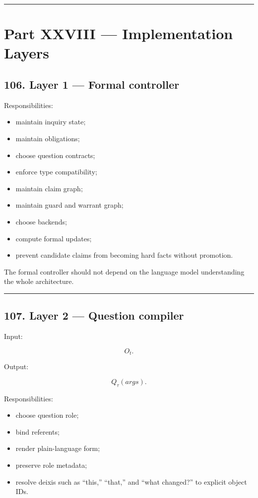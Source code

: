 \documentclass[
]{article}
\providecommand{\tightlist}{%
  \setlength{\itemsep}{0pt}\setlength{\parskip}{0pt}}
\begin{document}
\begin{center}\rule{0.5\linewidth}{0.5pt}\end{center}

\section{Part XXVIII --- Implementation
Layers}\label{part-xxviii-implementation-layers}

\subsection{106. Layer 1 --- Formal
controller}\label{layer-1-formal-controller}

Responsibilities:

\begin{itemize}
\tightlist
\item
  maintain inquiry state;
\item
  maintain obligations;
\item
  choose question contracts;
\item
  enforce type compatibility;
\item
  maintain claim graph;
\item
  maintain guard and warrant graph;
\item
  choose backends;
\item
  compute formal updates;
\item
  prevent candidate claims from becoming hard facts without promotion.
\end{itemize}

The formal controller should not depend on the language model
understanding the whole architecture.

\begin{center}\rule{0.5\linewidth}{0.5pt}\end{center}

\subsection{107. Layer 2 --- Question
compiler}\label{layer-2-question-compiler}

Input:

\[
O_t.
\]

Output:

\[
Q_\tau(args).
\]

Responsibilities:

\begin{itemize}
\tightlist
\item
  choose question role;
\item
  bind referents;
\item
  render plain-language form;
\item
  preserve role metadata;
\item
  resolve deixis such as ``this,'' ``that,'' and ``what changed?'' to
  explicit object IDs.
\end{itemize}
\end{document}
